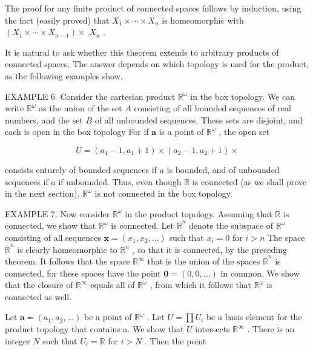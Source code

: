 The proof for any finite product of connected spaces follows by induction, using the fact (easily proved) that \({X}_{1} \times  \cdots  \times  {X}_{n}\) is homeomorphic with \(\left( {{X}_{1} \times  \cdots  \times  {X}_{n - 1}}\right)  \times\)  \({X}_{n}\) .

It is natural to ask whether this theorem extends to arbitrary products of connected spaces. The answer depends on which topology is used for the product, as the following examples show.

EXAMPLE 6. Consider the cartesian product \({\mathbb{R}}^{\omega }\) in the box topology. We can write \({\mathbb{R}}^{\omega }\) as the union of the set \(A\) consisting of all bounded sequences of real numbers, and the set \(B\) of all unbounded sequences. These sets are disjoint, and each is open in the box topology For if \(\mathbf{a}\) is a point of \({\mathbb{R}}^{\omega }\) , the open set

\[
U = \left( {{a}_{1} - 1,{a}_{1} + 1}\right)  \times  \left( {{a}_{2} - 1,{a}_{2} + 1}\right)  \times
\]

consists enturely of bounded sequences if \(a\) is bounded, and of unbounded sequences if \(a\) if unbounded. Thus, even though \(\mathbb{R}\) is connected (as we shall prove in the next section), \({\mathbb{R}}^{\omega }\) is not connected in the box topology.

EXAMPLE 7. Now consider \({\mathbb{R}}^{\omega }\) in the product topology. Assuming that \(\mathbb{R}\) is connected, we show that \({\mathbb{R}}^{\omega }\) is connected. Let \({\overline{\mathbb{R}}}^{n}\) denote the subspace of \({\mathbb{R}}^{\omega }\) consisting of all sequences \(\mathbf{x} = \left( {{x}_{1},{x}_{2},\ldots }\right)\) such that \({x}_{i} = 0\) for \(i > n\) The space \({\overline{\mathbb{R}}}^{n}\) is clearly homeomorphic to \({\mathbb{R}}^{n}\) , so that it is connected, by the preceding theorem. It follows that the space \({\mathbb{R}}^{\infty }\) that is the union of the spaces \({\overline{\mathbb{R}}}^{n}\) is connected, for these spaces have the point \(\mathbf{0} = \left( {0,0,\ldots }\right)\) in common. We show that the closure of \({\mathbb{R}}^{\infty }\) equals all of \({\mathbb{R}}^{\omega }\) , from which it follows that \({\mathbb{R}}^{\omega }\) is connected as well.

Let \(\mathbf{a} = \left( {{a}_{1},{a}_{2},\ldots }\right)\) be a point of \({\mathbb{R}}^{\omega }\) . Let \(U = \prod {U}_{i}\) be a basis element for the product topology that contains a. We show that \(U\) intersects \({\mathbb{R}}^{\infty }\) . There is an integer \(N\) such that \({U}_{i} = \mathbb{R}\) for \(i > N\) . Then the point

